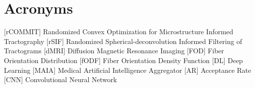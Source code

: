 \chapter*{Acronyms}



\begin{acronym}
       [rCOMMIT]   {Randomized Convex Optimization for Microstructure Informed Tractography}
       [rSIF]   {Randomized Spherical-deconvolution Informed Filtering of Tractograms}
     [dMRI] {Diffusion Magnetic Resonance Imaging}
       [FOD]   {Fiber Orientation Distribution}
       [fODF]   {Fiber Orientation Density Function}
       [DL]   {Deep Learning}
       [MAIA]   {Medical Artificial Intelligence Aggregator}
       [AR]   {Acceptance Rate}
       [CNN]   {Convolutional Neural Network}


\end{acronym}
